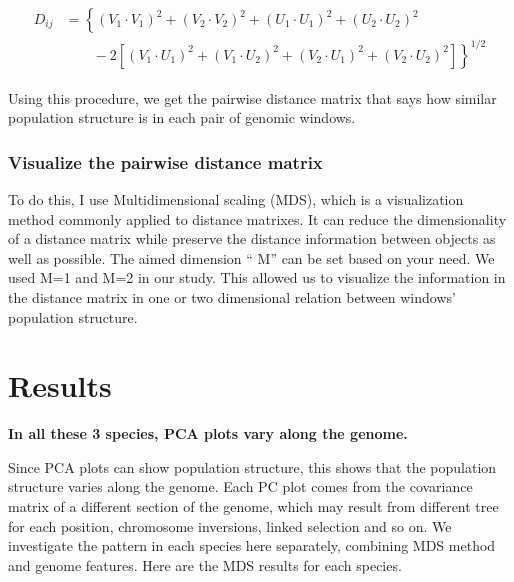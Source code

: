 \documentclass[11pt, oneside]{article}   	%
\begin{document}
\begin{align}
    \begin{split}
    D_{ij} &= 
        \left \{
                \left ( 
                    V_{1}\cdot V_{1}^{} 
                \right )^{2}
                + \left ( V_{2}\cdot V_{2}^{} \right )^{2}
                + \left ( U_{1}\cdot U_{1}^{} \right )^{2} 
                +\left ( U_{2}\cdot U_{2}^{} \right )^{2} 
        \right. \\ 
        & \left. \qquad {}  
            -2\left [ 
                \left ( V_{1}\cdot U_{1}^{} \right )^{2}
                + \left ( V_{1}\cdot U_{2}^{} \right )^{2}
                + \left ( V_{2}\cdot U_{1}^{} \right )^{2} 
                + \left ( V_{2}\cdot U_{2}^{} \right )^{2}
            \right ]
        \right \}^{1/2}
    \end{split}
\end{align}

Using this procedure, 
we get the pairwise distance matrix that says how similar population structure is 
in each pair of genomic windows.

\subsubsection{Visualize the pairwise distance matrix}
To do this, I use Multidimensional scaling (MDS), 
which is a visualization method commonly applied to distance matrixes. 
It can reduce the dimensionality of a distance matrix while preserve the distance information between objects as well as possible. The aimed dimension `` M'' can be set based on your need. We used M=1 and M=2 in our study. This allowed us to visualize the information in the distance matrix in one or two dimensional relation between windows' population structure.

\section{Results}
\textbf{In all these 3 species, PCA plots vary along the genome.}

Since PCA plots can show population structure, this shows that the population structure varies along the genome. Each PC plot comes from the covariance matrix of a different section of the genome, which may result from different tree for each position, chromosome inversions, linked selection and so on. We investigate the pattern in each species here separately, combining MDS method and genome features.
Here are the MDS results for each species.
\end{document}
